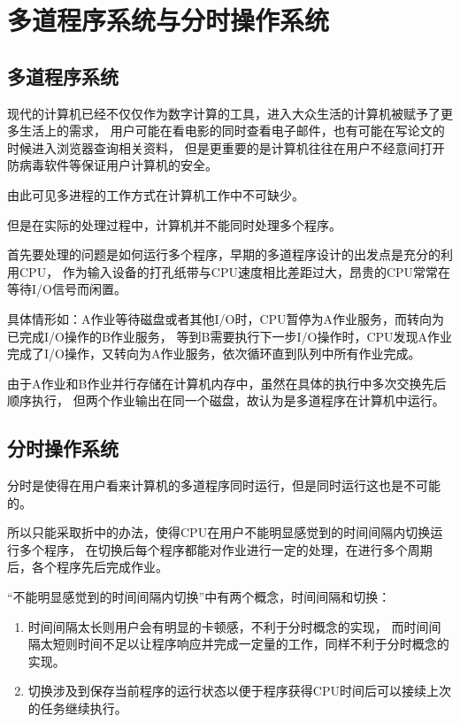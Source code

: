 
\section{多道程序系统与分时操作系统}

\subsection{多道程序系统}

现代的计算机已经不仅仅作为数字计算的工具，进入大众生活的计算机被赋予了更多生活上的需求，
用户可能在看电影的同时查看电子邮件，也有可能在写论文的时候进入浏览器查询相关资料，
但是更重要的是计算机往往在用户不经意间打开防病毒软件等保证用户计算机的安全。

由此可见多进程的工作方式在计算机工作中不可缺少。

但是在实际的处理过程中，计算机并不能同时处理多个程序。

首先要处理的问题是如何运行多个程序，早期的多道程序设计的出发点是充分的利用CPU，
作为输入设备的打孔纸带与CPU速度相比差距过大，昂贵的CPU常常在等待I/O信号而闲置。

具体情形如：A作业等待磁盘或者其他I/O时，CPU暂停为A作业服务，而转向为已完成I/O操作的B作业服务，
等到B需要执行下一步I/O操作时，CPU发现A作业完成了I/O操作，又转向为A作业服务，依次循环直到队列中所有作业完成。

由于A作业和B作业并行存储在计算机内存中，虽然在具体的执行中多次交换先后顺序执行，
但两个作业输出在同一个磁盘，故认为是多道程序在计算机中运行。

\subsection{分时操作系统}

分时是使得在用户看来计算机的多道程序同时运行，但是同时运行这也是不可能的。

所以只能采取折中的办法，使得CPU在用户不能明显感觉到的时间间隔内切换运行多个程序，
在切换后每个程序都能对作业进行一定的处理，在进行多个周期后，各个程序先后完成作业。

“不能明显感觉到的时间间隔内切换”中有两个概念，时间间隔和切换：

\begin{enumerate}
	\item 时间间隔太长则用户会有明显的卡顿感，不利于分时概念的实现，
	      而时间间隔太短则时间不足以让程序响应并完成一定量的工作，同样不利于分时概念的实现。
	\item 切换涉及到保存当前程序的运行状态以便于程序获得CPU时间后可以接续上次的任务继续执行。
\end{enumerate}

